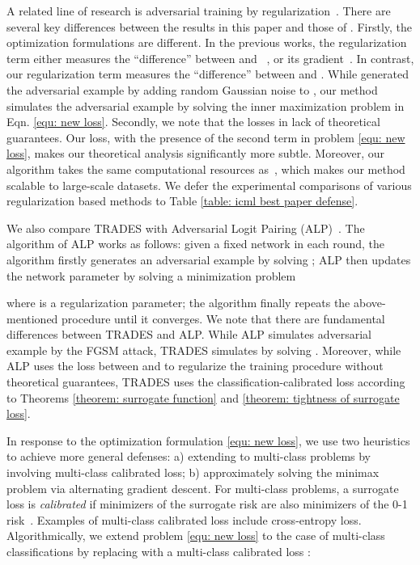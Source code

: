 \documentclass[11pt]{article}
\newcommand{\0}{\mathbf{0}}
\newcommand{\1}{\mathbf{1}}
\begin{document}
A related line of research is adversarial training by regularization~\cite{miyato2018virtual,kurakin2016adversarial,ross2017improving,zheng2016improving}. There are several key differences between the results in this paper and those of \cite{kurakin2016adversarial,ross2017improving,zheng2016improving}. Firstly, the optimization formulations are different. In the previous works, the regularization term either measures the ``difference'' between  and ~\cite{kurakin2016adversarial}, or its gradient~\cite{ross2017improving}. In contrast, our regularization term measures the ``difference'' between  and . While \cite{zheng2016improving} generated the adversarial example  by adding random Gaussian noise to , our method simulates the adversarial example by solving the inner maximization problem in Eqn. \eqref{equ: new loss}. Secondly, we note that the losses in \cite{miyato2018virtual,kurakin2016adversarial,ross2017improving,zheng2016improving} lack of theoretical guarantees. Our loss, with the presence of the second term in problem \eqref{equ: new loss}, makes our theoretical analysis significantly more subtle. Moreover, our algorithm takes the same computational resources as~\cite{kurakin2016adversarial}, which makes our method scalable to large-scale datasets. We defer the experimental comparisons of various regularization based methods to Table \ref{table: icml best paper defense}.



\medskip
{} We also compare TRADES with Adversarial Logit Pairing (ALP)~\cite{kannan2018adversarial,engstrom2018evaluating}. The algorithm of ALP works as follows: given a fixed network  in each round, the algorithm firstly generates an adversarial example  by solving
; ALP then updates the network parameter by solving a minimization problem

where  is a regularization parameter; the algorithm finally repeats the above-mentioned procedure until it converges.
We note that there are fundamental differences between TRADES and ALP. While ALP simulates adversarial example  by the FGSM attack, TRADES simulates  by solving . Moreover, while ALP uses the  loss between  and  to regularize the training procedure without theoretical guarantees, TRADES uses the classification-calibrated loss according to Theorems \ref{theorem: surrogate function} and \ref{theorem: tightness of surrogate loss}.


\medskip
{}
In response to the optimization formulation \eqref{equ: new loss}, we use two heuristics to achieve more general defenses: a) extending to multi-class problems by involving multi-class calibrated loss; b) approximately solving the minimax problem via alternating gradient descent.
For multi-class problems, a surrogate loss is \emph{calibrated} if minimizers of the surrogate risk are also minimizers of the 0-1
risk~\cite{pires2016multiclass}. Examples of multi-class calibrated loss include cross-entropy loss. Algorithmically, we extend problem \eqref{equ: new loss} to the case of multi-class classifications by replacing  with a multi-class calibrated loss :
\end{document}
